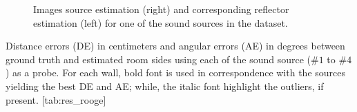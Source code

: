 \begin{figure}[t]
    \begin{fullwidth}
    \centering
    \hfill
    \caption{Images source estimation (right) and corresponding reflector estimation (left) for one of the sound sources in the dataset.}
    \label{fig:dechorateapp:wall_rec}
    \end{fullwidth}
\end{figure}




\begin{table}[h!]
    \begin{sidecaption}[]{
        Distance errors (DE) in centimeters and angular errors (AE) in degrees between ground truth and estimated room sides using each of the sound source ($\#1$ to $\#4$) as a probe. For each wall, bold font is used in correspondence with the sources yielding the best DE and AE; while, the italic font highlight the outliers, if present.
        }[tab:res_rooge]
    \centering
    \small
    
    \end{sidecaption}
\end{table}

